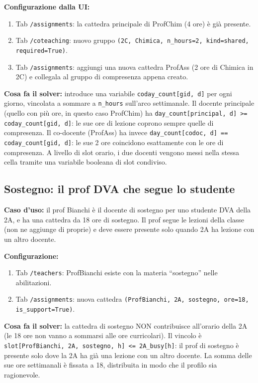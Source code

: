 \textbf{Configurazione dalla UI:}
\begin{enumerate}
\item Tab \texttt{/assignments}: la cattedra principale di
ProfChim (4 ore) \`e gi\`a presente.
\item Tab \texttt{/coteaching}: nuovo gruppo
\texttt{(2C, Chimica, n\_hours=2, kind=shared,
required=True)}.
\item Tab \texttt{/assignments}: aggiungi una nuova cattedra
ProfAss (2 ore di Chimica in 2C) e collegala al gruppo di
compresenza appena creato.
\end{enumerate}

\textbf{Cosa fa il solver:} introduce una variabile
\texttt{coday\_count[gid, d]} per ogni giorno, vincolata a
sommare a \texttt{n\_hours} sull'arco settimanale. Il
docente principale (quello con pi\`u ore, in questo caso
ProfChim) ha
\texttt{day\_count[principal, d] >= coday\_count[gid, d]}: le
sue ore di lezione coprono sempre quelle di compresenza. Il
co-docente (ProfAss) ha invece
\texttt{day\_count[codoc, d] == coday\_count[gid, d]}: le
sue 2 ore coincidono esattamente con le ore di compresenza.
A livello di slot orario, i due docenti vengono messi nella
stessa cella tramite una variabile booleana di slot
condiviso.

\subsection{Sostegno: il prof DVA che segue lo studente}

\textbf{Caso d'uso:} il prof Bianchi \`e il docente di
sostegno per uno studente DVA della 2A, e ha una cattedra
da 18 ore di sostegno. Il prof segue le lezioni della classe
(non ne aggiunge di proprie) e deve essere presente solo
quando 2A ha lezione con un altro docente.

\textbf{Configurazione:}
\begin{enumerate}
\item Tab \texttt{/teachers}: ProfBianchi esiste con la
materia ``sostegno'' nelle abilitazioni.
\item Tab \texttt{/assignments}: nuova cattedra
\texttt{(ProfBianchi, 2A, sostegno, ore=18,
is\_support=True)}.
\end{enumerate}

\textbf{Cosa fa il solver:} la cattedra di sostegno NON
contribuisce all'orario della 2A (le 18 ore non vanno a
sommarsi alle ore curricolari). Il vincolo \`e
\texttt{slot[ProfBianchi, 2A, sostegno, h] <= 2A\_busy[h]}:
il prof di sostegno \`e presente solo dove la 2A ha gi\`a
una lezione con un altro docente. La somma delle sue ore
settimanali \`e fissata a 18, distribuita in modo che il
profilo sia ragionevole.

